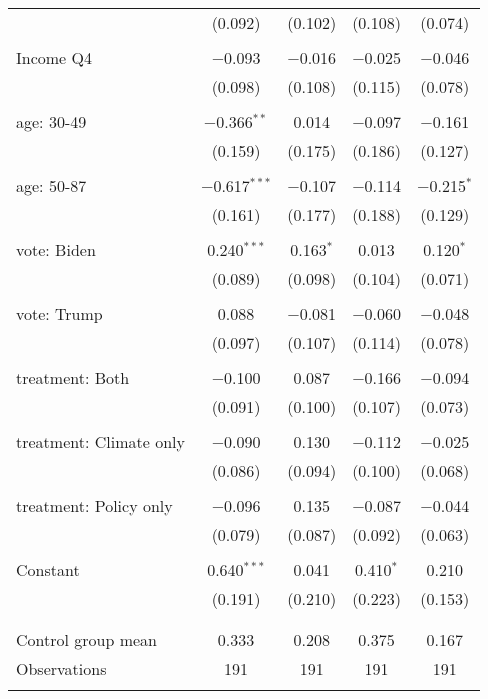 \begin{tabular}{@{\extracolsep{5pt}}lcccc}
  & (0.092) & (0.102) & (0.108) & (0.074) \\ 
  & & & & \\ 
 Income Q4 & $-$0.093 & $-$0.016 & $-$0.025 & $-$0.046 \\ 
  & (0.098) & (0.108) & (0.115) & (0.078) \\ 
  & & & & \\ 
 age: 30-49 & $-$0.366$^{**}$ & 0.014 & $-$0.097 & $-$0.161 \\ 
  & (0.159) & (0.175) & (0.186) & (0.127) \\ 
  & & & & \\ 
 age: 50-87 & $-$0.617$^{***}$ & $-$0.107 & $-$0.114 & $-$0.215$^{*}$ \\ 
  & (0.161) & (0.177) & (0.188) & (0.129) \\ 
  & & & & \\ 
 vote: Biden & 0.240$^{***}$ & 0.163$^{*}$ & 0.013 & 0.120$^{*}$ \\ 
  & (0.089) & (0.098) & (0.104) & (0.071) \\ 
  & & & & \\ 
 vote: Trump & 0.088 & $-$0.081 & $-$0.060 & $-$0.048 \\ 
  & (0.097) & (0.107) & (0.114) & (0.078) \\ 
  & & & & \\ 
 treatment: Both & $-$0.100 & 0.087 & $-$0.166 & $-$0.094 \\ 
  & (0.091) & (0.100) & (0.107) & (0.073) \\ 
  & & & & \\ 
 treatment: Climate only & $-$0.090 & 0.130 & $-$0.112 & $-$0.025 \\ 
  & (0.086) & (0.094) & (0.100) & (0.068) \\ 
  & & & & \\ 
 treatment: Policy only & $-$0.096 & 0.135 & $-$0.087 & $-$0.044 \\ 
  & (0.079) & (0.087) & (0.092) & (0.063) \\ 
  & & & & \\ 
 Constant & 0.640$^{***}$ & 0.041 & 0.410$^{*}$ & 0.210 \\ 
  & (0.191) & (0.210) & (0.223) & (0.153) \\ 
  & & & & \\ 
\hline \\[-1.8ex] 
Control group mean & 0.333 & 0.208 & 0.375 & 0.167 \\ 
Observations & 191 & 191 & 191 & 191 \\ 
\hline 
\hline \\[-1.8ex] 
\end{tabular} 

